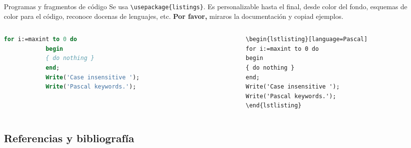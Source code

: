 \documentclass[12pt]{beamer}
\begin{document}
\begin{frame}[fragile]{Programas y fragmentos de código}
	Se usa \verb|\usepackage{listings}|. Es personalizable hasta el final, desde color del fondo, esquemas de color para el código, reconoce docenas de lenguajes, etc. \textbf{Por favor,} miraros la documentación y copiad ejemplos.
	\begin{columns}
		\small
		\begin{column}{-\textwidth}
			\begin{lstlisting}[language=Pascal]
			for i:=maxint to 0 do
			begin
			{ do nothing }
			end;
			Write('Case insensitive ');
			Write('Pascal keywords.');
			\end{lstlisting}
		\end{column}
		\hspace*{-3em}\begin{column}{\textwidth}
			\begin{verbatim}
			\begin{lstlisting}[language=Pascal]
			for i:=maxint to 0 do
			begin
			{ do nothing }
			end;
			Write('Case insensitive ');
			Write('Pascal keywords.');
			\end{lstlisting}
			\end{verbatim}
		\end{column}
	\end{columns}
\end{frame}

\subsection{Referencias y bibliografía}
\end{document}
